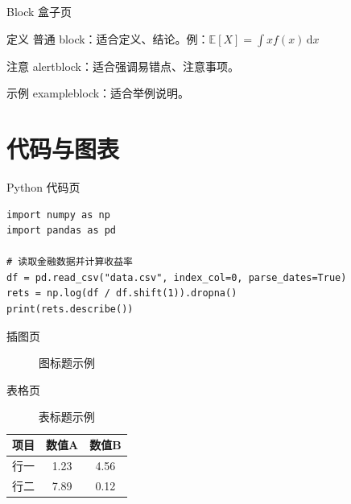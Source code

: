 \documentclass[9pt]{ctexbeamer}
\begin{document}
\begin{frame}{Block 盒子页}
	\begin{block}{定义}
		普通 block：适合定义、结论。\quad 例：$\mathbb{E}[X] = \int x f(x)\,\mathrm{d}x$
	\end{block}
	\begin{alertblock}{注意}
		alertblock：适合强调易错点、注意事项。
	\end{alertblock}
	\begin{exampleblock}{示例}
		exampleblock：适合举例说明。
	\end{exampleblock}
\end{frame}

\section{代码与图表}

\begin{frame}[fragile]{Python 代码页}
	\begin{lstlisting}
import numpy as np
import pandas as pd

# 读取金融数据并计算收益率
df = pd.read_csv("data.csv", index_col=0, parse_dates=True)
rets = np.log(df / df.shift(1)).dropna()
print(rets.describe())
\end{lstlisting}
\end{frame}

\begin{frame}{插图页}
	\begin{figure}
		\centering
		\caption{图标题示例}
	\end{figure}
\end{frame}

\begin{frame}{表格页}
	\begin{table}
		\centering
		\caption{表标题示例}
		\begin{tabular}{lcc}
			\toprule
			项目 & 数值A & 数值B \\
			\midrule
			行一 & 1.23 & 4.56 \\
			行二 & 7.89 & 0.12 \\
			\bottomrule
		\end{tabular}
	\end{table}
\end{frame}
\end{document}
